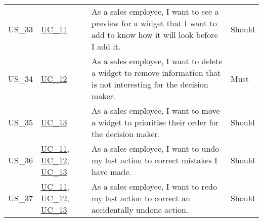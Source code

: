\begin{footnotesize}
\begin{longtable}[L L L L]{ p{} p{} p{} p{} }
      \hypertarget{Ref:US33}{US\_33} & \hyperlink{Ref:UC11}{UC\_11} & As a sales employee, I want to see a preview for a \gls{widget} that I want to add to know how it will look before I add it. & Should \\
      \hypertarget{Ref:US34}{US\_34} & \hyperlink{Ref:UC12}{UC\_12} & As a sales employee, I want to delete a \gls{widget} to remove information that is not interesting for the decision maker. & Must \\
      \hypertarget{Ref:US35}{US\_35} & \hyperlink{Ref:UC13}{UC\_13} \  & As a sales employee, I want to move a \gls{widget} to prioritise their order for the decision maker. & Should \\
      \hypertarget{Ref:US36}{US\_36} & \hyperlink{Ref:UC11}{UC\_11}, \newline \hyperlink{Ref:UC12}{UC\_12}, \newline \hyperlink{Ref:UC13}{UC\_13} & As a sales employee, I want to undo my last action to correct mistakes I have made. & Should \\
      \hypertarget{Ref:US37}{US\_37} & \hyperlink{Ref:UC11}{UC\_11}, \newline \hyperlink{Ref:UC12}{UC\_12}, \newline \hyperlink{Ref:UC13}{UC\_13} & As a sales employee, I want to redo my last action to correct an accidentally undone action. & Should \\
      \bottomrule
    \end{longtable}
  \end{footnotesize}
  \rmfamily

